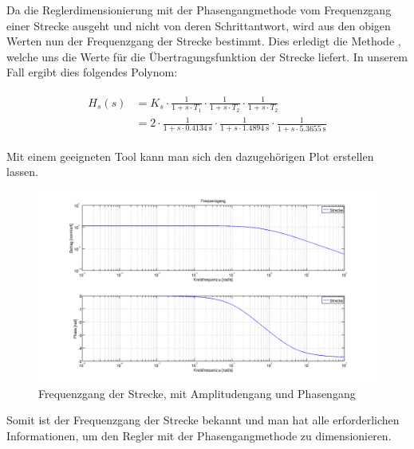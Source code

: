 Da  die  Reglerdimensionierung  mit  der  Phasengangmethode  vom  Frequenzgang
einer  Strecke  ausgeht und  nicht  von  deren  Schrittantwort, wird  aus  den
obigen Werten  nun der Frequenzgang  der Strecke bestimmt.  Dies  erledigt die
Methode  \footnotemark[3],  welche  uns die  Werte  f\"ur  die
\"Ubertragungsfunktion  der  Strecke liefert.   In  unserem  Fall ergibt  dies
folgendes Polynom:


\begin{gather} \label{eq:transfer:plant}
    \begin{split}
        H_s (s) & = K_s
                  \cdot \frac{1}{1 + s \cdot T_1}
                  \cdot \frac{1}{1 + s \cdot T_2}
                  \cdot \frac{1}{1 + s \cdot T_2}                     \\
                & = 2
                  \cdot \frac{1}{1 + s \cdot \SI{0.4134}{\second}}
                  \cdot \frac{1}{1 + s \cdot \SI{1.4894}{\second}}
                  \cdot \frac{1}{1 + s \cdot \SI{5.3655}{\second}}
    \end{split}
\end{gather}

Mit einem  geeigneten Tool  kann man sich  den dazugeh\"origen  Plot erstellen
lassen.

\begin{figure}[h! width=\pagewidth]
    \includegraphics[width=\textwidth]{images/streckeFrequenzgang.png}
    \caption{%
        Frequenzgang der Strecke, mit Amplitudengang und Phasengang
    }
    \label{fig:plant_freq}
\end{figure}

Somit ist der Frequenzgang der Strecke bekannt und man hat alle erforderlichen
Informationen, um den Regler mit der Phasengangmethode zu dimensionieren.

